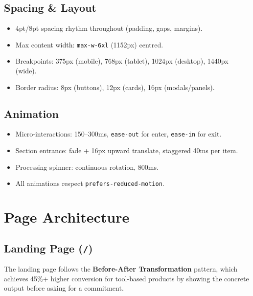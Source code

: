 \documentclass[12pt,a4paper]{article}
\begin{document}
\subsection{Spacing \& Layout}

\begin{itemize}
  \item 4pt/8pt spacing rhythm throughout (padding, gaps, margins).
  \item Max content width: \texttt{max-w-6xl} (1152px) centred.
  \item Breakpoints: 375px (mobile), 768px (tablet), 1024px (desktop),
        1440px (wide).
  \item Border radius: 8px (buttons), 12px (cards), 16px (modals/panels).
\end{itemize}

\subsection{Animation}

\begin{itemize}
  \item Micro-interactions: 150--300ms, \texttt{ease-out} for enter,
        \texttt{ease-in} for exit.
  \item Section entrance: fade + 16px upward translate, staggered 40ms per item.
  \item Processing spinner: continuous rotation, 800ms.
  \item All animations respect \texttt{prefers-reduced-motion}.
\end{itemize}

\section{Page Architecture}

\subsection{Landing Page (\texttt{/})}

The landing page follows the \textbf{Before-After Transformation} pattern, which
achieves 45\%+ higher conversion for tool-based products by showing the concrete
output before asking for a commitment.
\end{document}
